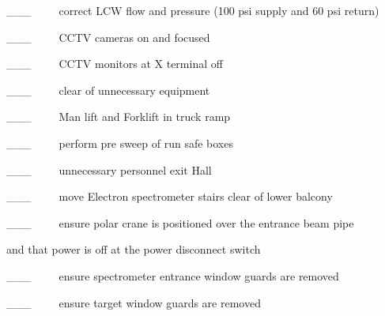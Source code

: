 \_\_\_~~~~~correct LCW flow and pressure (100 psi supply and 60 psi return)

\_\_\_~~~~~CCTV cameras on and focused

\_\_\_~~~~~CCTV monitors at X terminal off

\_\_\_~~~~~clear of unnecessary equipment

\_\_\_~~~~~Man lift and Forklift in truck ramp

\_\_\_~~~~~perform pre sweep of run safe boxes

\_\_\_~~~~~unnecessary personnel exit Hall

\_\_\_~~~~~move Electron spectrometer stairs clear of lower balcony

\_\_\_~~~~~ensure polar crane is positioned over the entrance beam pipe 

and that power is off at the power disconnect switch 

\_\_\_~~~~~ensure spectrometer entrance window guards are removed

\_\_\_~~~~~ensure target window guards are removed
